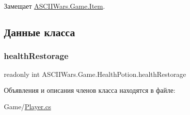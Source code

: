 Замещает \hyperlink{class_a_s_c_i_i_wars_1_1_game_1_1_item_a52412546f837bfc65a3aa9d728fa142f}{A\+S\+C\+I\+I\+Wars.\+Game.\+Item}.



\subsection{Данные класса}
\hypertarget{class_a_s_c_i_i_wars_1_1_game_1_1_health_potion_aa337067f250678b0825d86fc3e2868c5}{}\label{class_a_s_c_i_i_wars_1_1_game_1_1_health_potion_aa337067f250678b0825d86fc3e2868c5} 
\subsubsection{\texorpdfstring{health\+Restorage}{healthRestorage}}
{\footnotesize\ttfamily readonly int A\+S\+C\+I\+I\+Wars.\+Game.\+Health\+Potion.\+health\+Restorage}



Объявления и описания членов класса находятся в файле\+:\begin{DoxyCompactItemize}
\item 
Game/\hyperlink{_player_8cs}{Player.\+cs}\end{DoxyCompactItemize}
